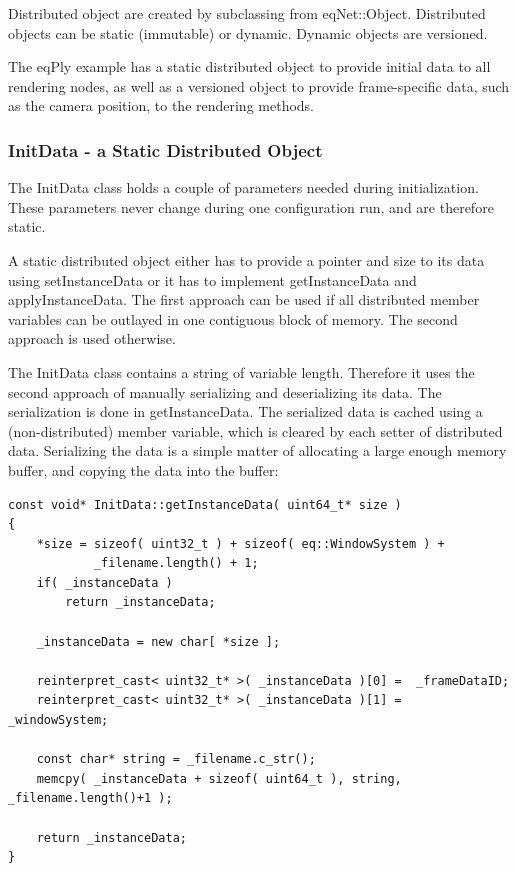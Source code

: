 \documentclass[10pt,a4]{scrartcl}
\begin{document}
Distributed object are created by subclassing from
\textsf{eqNet::Object}. Distributed objects can be static (immutable) or
dynamic. Dynamic objects are versioned.

The \textsf{eqPly} example has a static distributed object to provide
initial data to all rendering nodes, as well as a versioned object to
provide frame-specific data, such as the camera position, to the
rendering methods.

\subsubsection{InitData - a Static Distributed Object}

The \textsf{InitData} class holds a couple of parameters needed during
initialization. These parameters never change during one configuration
run, and are therefore static.

A static distributed object either has to provide a pointer and size to
its data using \textsf{setInstanceData} or it has to implement
\textsf{getInstanceData} and \textsf{applyInstanceData}. The first
approach can be used if all distributed member variables can be outlayed
in one contiguous block of memory. The second approach is used
otherwise.

The \textsf{InitData} class contains a string of variable
length. Therefore it uses the second approach of manually serializing
and deserializing its data. The serialization is done in
\textsf{getInstanceData}. The serialized data is cached using a
(non-distributed) member variable, which is cleared by each setter of
distributed data. Serializing the data is a simple matter of allocating
a large enough memory buffer, and copying the data into the buffer:

{\footnotesize\begin{lstlisting}
const void* InitData::getInstanceData( uint64_t* size )
{
    *size = sizeof( uint32_t ) + sizeof( eq::WindowSystem ) +
            _filename.length() + 1;
    if( _instanceData )
        return _instanceData;

    _instanceData = new char[ *size ];

    reinterpret_cast< uint32_t* >( _instanceData )[0] =  _frameDataID;
    reinterpret_cast< uint32_t* >( _instanceData )[1] =  _windowSystem;

    const char* string = _filename.c_str();
    memcpy( _instanceData + sizeof( uint64_t ), string, _filename.length()+1 );

    return _instanceData;
}
\end{lstlisting}}
\end{document}
